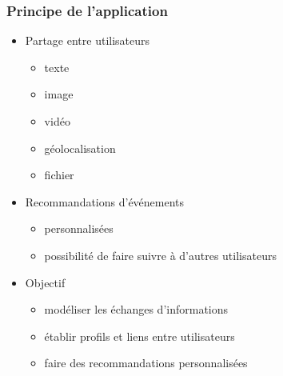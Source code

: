 \documentclass[c]{beamer}
\author{Igor Colin}
\date{\today}
\begin{document}
\begin{frame}
    \frametitle{Principe de l'application}

    \begin{itemize}
        \item Partage entre utilisateurs
            \begin{itemize}
                \item texte
                \item image
                \item vidéo
                \item géolocalisation
                \item fichier
            \end{itemize}
        \item Recommandations d'événements
            \begin{itemize}
                \item personnalisées
                \item possibilité de faire suivre à d'autres utilisateurs
            \end{itemize}
        \item Objectif
            \begin{itemize}
                \item modéliser les échanges d'informations
                \item établir profils et liens entre utilisateurs
                \item faire des recommandations personnalisées
            \end{itemize}
    \end{itemize}
\end{frame}
\end{document}
